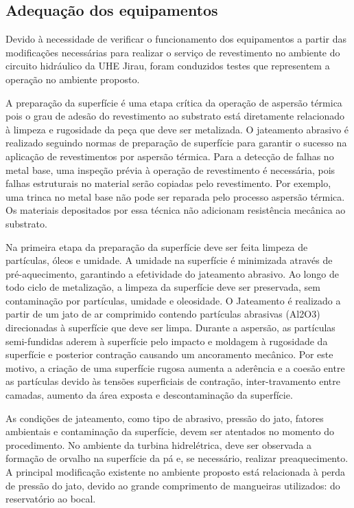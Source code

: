 \subsection{Adequação dos equipamentos}
Devido à necessidade de verificar o funcionamento dos equipamentos a partir das
modificações necessárias para realizar o serviço de revestimento no ambiente do
circuito hidráulico da UHE Jirau, foram conduzidos testes que representem a
operação no ambiente proposto.

A preparação da superfície é uma etapa crítica da operação de aspersão térmica
pois o grau de adesão do revestimento ao substrato está diretamente relacionado
à limpeza e rugosidade da peça que deve ser metalizada. O jateamento abrasivo é
realizado seguindo normas de preparação de superfície para garantir o sucesso
na aplicação de revestimentos por aspersão térmica. Para a detecção de falhas no
metal base, uma inspeção prévia à operação de revestimento é necessária, pois
falhas estruturais no material serão copiadas pelo revestimento. Por exemplo,
uma trinca no metal base não pode ser reparada pelo processo aspersão
térmica. Os materiais depositados por essa técnica não adicionam resistência
mecânica ao substrato.

Na primeira etapa da preparação da superfície deve ser feita limpeza de
partículas, óleos e umidade. A umidade na superfície é minimizada através
de pré-aquecimento, garantindo a efetividade do jateamento abrasivo. Ao longo de
todo ciclo de metalização, a limpeza da superfície deve ser preservada, sem
contaminação por partículas, umidade e oleosidade. O Jateamento é realizado a
partir de um jato de ar comprimido contendo partículas abrasivas (Al2O3)
direcionadas à superfície que deve ser limpa. Durante a aspersão, as partículas
semi-fundidas aderem à superfície pelo impacto e moldagem à rugosidade da
superfície e posterior contração causando um ancoramento mecânico. Por este
motivo, a criação de uma superfície rugosa aumenta a aderência e a coesão entre
as partículas devido às tensões superficiais de contração, inter-travamento
entre camadas, aumento da área exposta e descontaminação da superfície.

As condições de jateamento, como tipo de abrasivo, pressão do jato, fatores
ambientais e contaminação da superfície, devem ser atentados no momento do
procedimento. No ambiente da turbina hidrelétrica, deve ser observada a
formação de orvalho na superfície da pá e, se necessário, realizar
preaquecimento. A principal modificação existente no ambiente proposto está
relacionada à perda de pressão do jato, devido ao grande comprimento de
mangueiras utilizados: do reservatório ao bocal.

